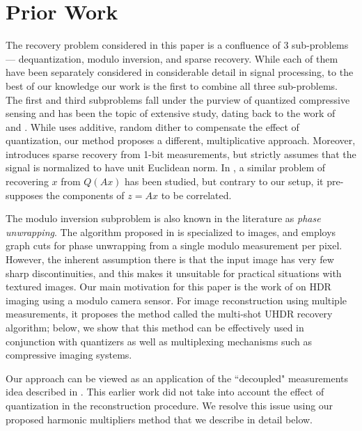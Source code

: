 \section{Prior Work}
\label{sec:Prior}
\vspace{-0.5em} %
The recovery problem considered in this paper is a confluence of 3 sub-problems --- dequantization, modulo inversion, and sparse recovery. While each of them have been separately considered in considerable detail in signal processing, to the best of our knowledge our work is the first to combine all three sub-problems. The first and third subproblems fall under the purview of quantized compressive sensing and has been the topic of extensive study, dating back to the work of~\cite{DBLP:journals/corr/JacquesC16} and \cite{boufounos20081}. While \cite{DBLP:journals/corr/JacquesC16} uses additive, random dither to compensate the effect of quantization, our method proposes a different, multiplicative approach. Moreover, \cite{boufounos20081} introduces sparse recovery from 1-bit measurements, but strictly assumes that the signal is normalized to have unit Euclidean norm. In \cite{kamilov2012message}, a similar problem of recovering $x$ from $Q(Ax)$ has been studied, but contrary to our setup, it pre-supposes the components of $z=Ax$ to be correlated. 

The modulo inversion subproblem is also known in the literature as \emph{phase unwrapping}. The algorithm proposed in \cite{bioucas2007phase} is specialized to images, and employs graph cuts for phase unwrapping from a single modulo measurement per pixel. However, the inherent assumption there is that the input image has very few sharp discontinuities, and this makes it unsuitable for practical situations with textured images. Our main motivation for this paper is the work of \cite{ICCP15_Zhao} on HDR imaging using a modulo camera sensor. For image reconstruction using multiple measurements, it proposes the method called the multi-shot UHDR recovery algorithm; below, we show that this method can be effectively used in conjunction with quantizers as well as multiplexing mechanisms such as compressive imaging systems. 

Our approach can be viewed as an application of the ``decoupled" measurements idea described in \cite{SoltaniHegde_ICASSP16}. This earlier work did not take into account the effect of quantization in the reconstruction procedure. We resolve this issue using our proposed harmonic multipliers method that we describe in detail below.
